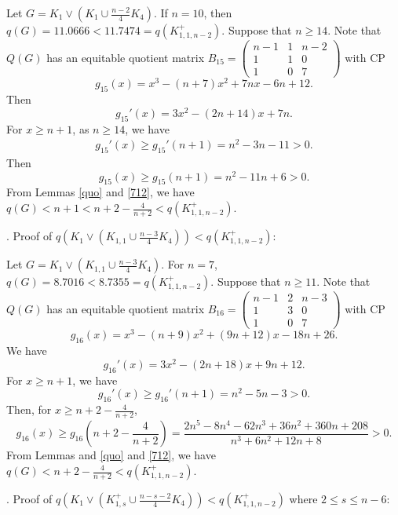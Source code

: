 \documentclass[12pt]{article}
\begin{document}
\begin{appendices}
Let $G= K_1\vee (K_1\cup \frac{n-2}{4}K_4)$.
If $n=10$, then $q(G)=11.0666<11.7474=q(K_{1,1,n-2}^+)$.
Suppose that $n\ge 14$. Note that $Q(G)$ has an equitable quotient matrix
$
B_{15}=
\left(\begin{smallmatrix}
n-1 &   1  & n-2   \\
1  &  1 &  0\\
1  & 0 & 7
\end{smallmatrix}\right)$
with CP
\[
g_{15}(x)=x^3 -( n + 7)x^2 + 7nx - 6n + 12.
\]
Then
\[
g_{15}'(x)=3x^2 - ( 2n + 14)x + 7n.
\]
For  $x\ge n+1$, as $n\ge 14$, we have
\begin{align*}
g_{15}'(x)\ge g_{15}'(n+1)=n^2 - 3n - 11>0.
\end{align*}
Then
\[
g_{15}(x)\ge g_{15}(n+1)=n^2 - 11n + 6>0.
\]
From Lemmas \ref{quo} and \ref{712}, we have $q(G)<n+1<n+2-\frac{4}{n+2}<q(K_{1,1,n-2}^+)$.

. Proof of $q(K_1\vee \left(K_{1,1}\cup \frac{n-3}{4}K_4\right))<q(K_{1,1,n-2}^+)$:

Let $G= K_1\vee \left(K_{1,1}\cup \frac{n-3}{4}K_4\right)$.
For $n=7$,  $q(G)=8.7016<8.7355=q(K_{1,1,n-2}^+)$.
Suppose that $n\ge 11$.
Note that $Q(G)$ has an equitable quotient matrix
$
B_{16}=
\left(\begin{smallmatrix}
n-1 &   2& n-3   \\
1  &  3 & 0\\
1 &  0 & 7
\end{smallmatrix}\right)$
with CP
\[
g_{16}(x)=x^3 - ( n + 9)x^2 + (9n + 12)x - 18n + 26.
\]
We have
\[
g_{16}'(x)=3x^2 - ( 2n + 18)x + 9n + 12.
\]
For  $x\ge n+1$, we have
\[
g_{16}'(x)\ge g_{16}'(n+1)=n^2 - 5n - 3>0.
\]
Then, for $x\ge n+2-\frac{4}{n+2}$,
\[
g_{16}(x)\ge g_{16}\left(n+2-\frac{4}{n+2}\right)=\frac{2n^5 - 8n^4 - 62n^3 + 36n^2 + 360n + 208}{n^3 + 6n^2 + 12n + 8}>0.
\]
From Lemmas and \ref{quo} and \ref{712}, we have $q(G)<n+2-\frac{4}{n+2}<q(K_{1,1,n-2}^+)$.


. Proof of $q(K_1\vee (K_{1,s}^+\cup \frac{n-s-2}{4}K_4))<q(K_{1,1,n-2}^+)$ where $2\le s\le n-6$:


\end{appendices}
\end{document}
